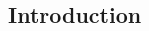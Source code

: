 \documentclass[oneside, a4paper, 12pt]{book}
\theoremstyle{definition}
\begin{document}
\mainmatter

\begin{CJK}{UTF8}{nkai}
\CJKhorz
\chapter{Introduction}\label{ch-introduction}

\end{CJK}





% 

% 

% 

%    

% 
\end{document}
